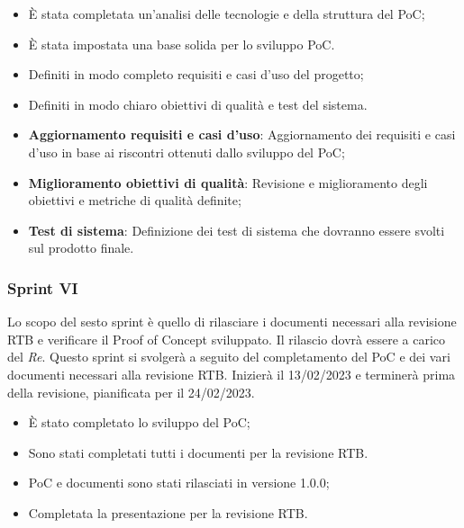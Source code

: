 \:
\begin{itemize}
	\item È stata completata un'analisi delle tecnologie e della struttura del PoC;
	\item È stata impostata una base solida per lo sviluppo PoC.
\end{itemize}

\:
\begin{itemize}
	\item Definiti in modo completo requisiti e casi d'uso del progetto;
	\item Definiti in modo chiaro obiettivi di qualità e test del sistema.
\end{itemize}

\:
\begin{itemize}
	\item \textbf{Aggiornamento requisiti e casi d'uso}: Aggiornamento dei requisiti e casi d'uso in base ai riscontri ottenuti dallo sviluppo del PoC;
	\item \textbf{Miglioramento obiettivi di qualità}: Revisione e miglioramento degli obiettivi e metriche di qualità definite;
	\item \textbf{Test di sistema}: Definizione dei test di sistema che dovranno essere svolti sul prodotto finale.
\end{itemize}

\subsubsection{Sprint VI}
Lo scopo del sesto sprint è quello di rilasciare i documenti necessari alla revisione RTB e verificare il Proof of Concept sviluppato. Il rilascio dovrà essere a carico del \textit{Re}.
Questo sprint si svolgerà a seguito del completamento del PoC e dei vari documenti necessari alla revisione RTB. Inizierà il 13/02/2023 e terminerà prima della revisione, pianificata per il 24/02/2023.

\:
\begin{itemize}
	\item È stato completato lo sviluppo del PoC;
	\item Sono stati completati tutti i documenti per la revisione RTB.
\end{itemize}

\:
\begin{itemize}
	\item PoC e documenti sono stati rilasciati in versione 1.0.0;
	\item Completata la presentazione per la revisione RTB.
\end{itemize}

